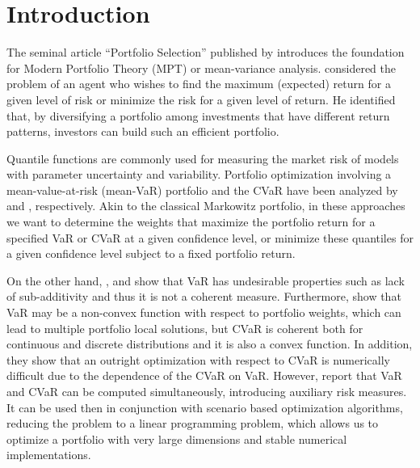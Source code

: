 \documentclass[a4paper,10pt]{article}
\begin{document}
\makeatletter

\makeatother

 


\section{Introduction}
 The seminal article ``Portfolio Selection'' published by  \citet*{markowitz1952} introduces the foundation for Modern Portfolio Theory (MPT) or mean-variance analysis. \citet*{markowitz1952} considered the problem of an agent who wishes to find the maximum (expected) return for a given level of risk or minimize the risk for a given level of return. He identified that, by diversifying a portfolio among investments that have different return patterns, investors can build such an efficient portfolio.

Quantile functions are commonly used for measuring the market risk of models with parameter uncertainty and variability. Portfolio optimization involving a mean-value-at-risk (mean-VaR) portfolio and the CVaR have been analyzed by \citet*{alexander2002} and \citet*{rockafellar2000}, respectively. Akin to the classical Markowitz portfolio, in these approaches we want to determine the weights that maximize the portfolio return for a specified VaR or CVaR at a given confidence level, or minimize these quantiles for a given confidence level subject to a fixed portfolio return.

On the other hand, \citet{artzner1999}, \citet*{szego2005} and \citet*{zhu2009worst} show that VaR has undesirable properties such as lack of sub-additivity and thus it is not a coherent measure. Furthermore, \citet*{uryasev2001} show that VaR may be a non-convex function with respect to portfolio weights, which can lead to multiple portfolio local solutions, but CVaR is coherent both for continuous and discrete distributions and it is also a convex function. In addition, they show that an outright optimization with respect to CVaR is numerically difficult due to the dependence of the CVaR on VaR. However, \citet*{rockafellar2000} report that VaR and CVaR can be computed simultaneously, introducing auxiliary risk measures. It can be used then in conjunction with scenario based optimization algorithms, reducing the problem to a linear programming problem, which allows us to optimize a portfolio with very large dimensions and stable numerical implementations. 
\end{document}
